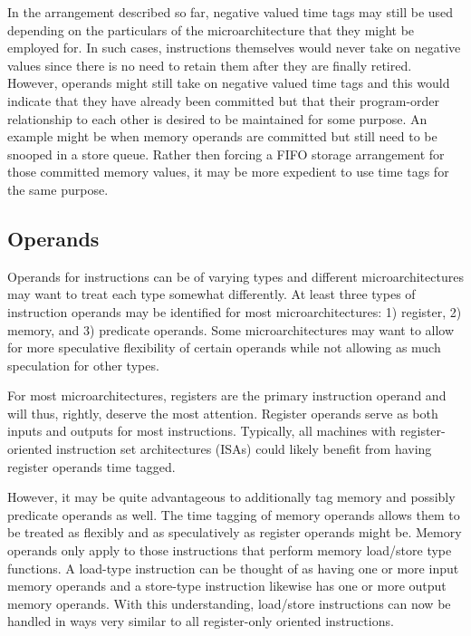 \documentclass[10pt,twocolumn]{article}
\begin{document}
In the arrangement described so far, negative valued time tags may still
be used depending on the particulars of the microarchitecture
that they might be employed for.  In such cases, instructions
themselves would never take on negative values since there
is no need to retain them after they are finally retired.
However, operands might still take on negative valued time tags and this
would indicate that they have already been committed but that
their program-order relationship to each other is desired
to be maintained for some purpose.
An example might be when memory operands are committed but
still need to be snooped in a store queue.
Rather then forcing a FIFO storage arrangement for those committed
memory values, it may be more expedient to use time tags
for the same purpose.
%
%
\vspace{-0.25in}
\subsection{Operands}
\vspace{-0.15in}
%
Operands for instructions can be of varying types and
different microarchitectures may want to treat each type
somewhat differently.
At least three types of instruction operands may be identified
for most microarchitectures: 
1) register, 2) memory, and 3) predicate operands.
Some microarchitectures may want to allow for more speculative
flexibility of certain operands while not allowing
as much speculation for other types.

For most microarchitectures, registers are the primary instruction
operand and will thus, rightly, deserve the most attention.
Register operands serve as both inputs and outputs for most
instructions.
Typically, all machines with register-oriented instruction set
architectures (ISAs) could
likely benefit from having register operands time tagged.

However, it may be quite advantageous to additionally tag 
memory and possibly predicate operands as well.
The time tagging of memory operands allows them to be
treated as flexibly and as speculatively as register operands
might be.  
Memory operands only apply to those instructions that
perform memory load/store type functions.  
A load-type instruction
can be thought of as having one or more input memory operands
and a store-type instruction likewise has one or more output
memory operands.  With this understanding, load/store instructions
can now be handled in ways very similar to all register-only
oriented instructions.
\end{document}
